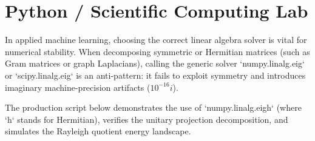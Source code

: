 \section{Python / Scientific Computing Lab}

In applied machine learning, choosing the correct linear algebra solver is vital for numerical stability. When decomposing symmetric or Hermitian matrices (such as Gram matrices or graph Laplacians), calling the generic solver `numpy.linalg.eig` or `scipy.linalg.eig` is an anti-pattern: it fails to exploit symmetry and introduces imaginary machine-precision artifacts ($10^{-16} i$).

The production script below demonstrates the use of `numpy.linalg.eigh` (where `h` stands for Hermitian), verifies the unitary projection decomposition, and simulates the Rayleigh quotient energy landscape.

